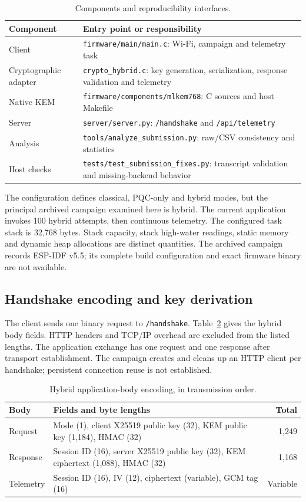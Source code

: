 \documentclass[pdflatex,sn-mathphys-num]{sn-jnl}
\begin{document}
\begin{table}[htbp]
\caption{Components and reproducibility interfaces.}
\label{tab:components}
\centering\small
\begin{tabularx}{\columnwidth}{lX}
\toprule
Component & Entry point or responsibility\\
\midrule
Client & \texttt{firmware/main/main.c}: Wi-Fi, campaign and telemetry task\\
Cryptographic adapter & \texttt{crypto\_hybrid.c}: key generation, serialization, response validation and telemetry\\
Native KEM & \texttt{firmware/components/mlkem768}: C sources and host Makefile\\
Server & \texttt{server/server.py}: \texttt{/handshake} and \texttt{/api/telemetry}\\
Analysis & \texttt{tools/analyze\_submission.py}: raw/CSV consistency and statistics\\
Host checks & \texttt{tests/test\_submission\_fixes.py}: transcript validation and missing-backend behavior\\
\bottomrule
\end{tabularx}
\end{table}

The configuration defines classical, PQC-only and hybrid modes, but the principal archived campaign examined here is hybrid. The current application invokes 100 hybrid attempts, then continuous telemetry. The configured task stack is 32,768 bytes. Stack capacity, stack high-water readings, static memory and dynamic heap allocations are distinct quantities. The archived campaign records ESP-IDF v5.5; its complete build configuration and exact firmware binary are not available.

\subsection{Handshake encoding and key derivation}
The client sends one binary request to \texttt{/handshake}. Table~\ref{tab:messages} gives the hybrid body fields. HTTP headers and TCP/IP overhead are excluded from the listed lengths. The application exchange has one request and one response after transport establishment. The campaign creates and cleans up an HTTP client per handshake; persistent connection reuse is not established.

\begin{table}[htbp]
\caption{Hybrid application-body encoding, in transmission order.}
\label{tab:messages}
\centering\small
\begin{tabularx}{\columnwidth}{lXr}
\toprule
Body & Fields and byte lengths & Total\\
\midrule
Request & Mode (1), client X25519 public key (32), KEM public key (1,184), HMAC (32) & 1,249\\
Response & Session ID (16), server X25519 public key (32), KEM ciphertext (1,088), HMAC (32) & 1,168\\
Telemetry & Session ID (16), IV (12), ciphertext (variable), GCM tag (16) & Variable\\
\bottomrule
\end{tabularx}
\end{table}
\end{document}

